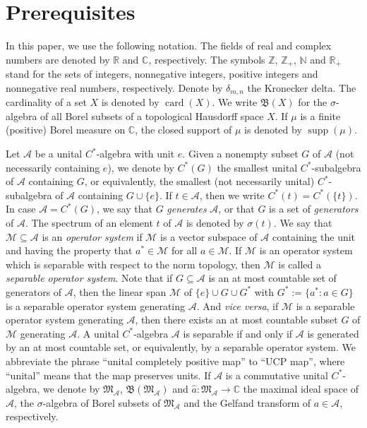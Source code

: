 \documentclass[reqno]{amsproc}
\DeclareMathOperator*{\card}{card}
\DeclareMathOperator{\supp}{supp}
\numberwithin{equation}{section}
\theoremstyle{remark}
\newcommand*{\ascr}{\mathscr{A}}
\newcommand*{\natu}{\mathbb{N}}
\newcommand*{\mcal}{\mathcal{M}}
\newcommand*{\comp}{\mathbb{C}}
\newcommand*{\borel}{\mathfrak{B}}
\newcommand*{\cbb}{\comp}
\theoremstyle{definition}
\newcommand*{\rbb}{\mathbb{R}}
\newcommand*{\zbb}{\mathbb{Z}}
\begin{document}
   \section{\label{Sec.2}Prerequisites}
In this paper, we use the following notation. The
fields of real and complex numbers are denoted by
$\rbb$ and $\mathbb{C}$, respectively. The symbols
$\zbb$, $\zbb_{+}$, $\natu$ and $\rbb_+$ stand for the
sets of integers, nonnegative integers, positive
integers and nonnegative real numbers, respectively.
Denote by $\delta_{m,n}$ the Kronecker delta. The
cardinality of a set $X$ is denoted by $\card(X)$. We
write $\borel(X)$ for the $\sigma$-algebra of all
Borel subsets of a topological Hausdorff space $X$. If
$\mu$ is a finite (positive) Borel measure on $\cbb$,
the closed support of $\mu$ is denoted by
$\supp(\mu)$.

Let $\ascr$ be a unital $C^*$-algebra with unit $e$.
Given a nonempty subset $G$ of $\ascr$ (not
necessarily containing $e$), we denote by $C^*(G)$ the
smallest unital $C^*$-subalgebra of $\ascr$ containing
$G$, or equivalently, the smallest (not necessarily
unital) $C^*$-subalgebra of $\ascr$ containing $G\cup
\{e\}$. If $t\in \ascr$, then we write
$C^*(t)=C^*(\{t\})$. In case $\ascr=C^*(G)$, we say
that $G$ {\em generates} $\ascr$, or that $G$ is a set
of {\em generators} of $\ascr$. The spectrum of an
element $t$ of $\ascr$ is denoted by $\sigma(t)$. We
say that $\mcal \subseteq \ascr$ is an {\em operator
system} if $\mcal$ is a vector subspace of $\ascr$
containing the unit and having the property that
$a^*\in \mcal$ for all $a\in \mcal$. If $\mcal$ is an
operator system which is separable with respect to the
norm topology, then $\mcal$ is called a {\em separable
operator system}. Note that if $ G\subseteq \ascr$ is
an at most countable set of generators of $\ascr$,
then the linear span $\mcal$ of $\{e\} \cup G \cup
G^*$ with $G^*:=\{a^*\colon a \in G\}$ is a separable
operator system generating $\ascr$. And {\em vice
versa}, if $\mcal$ is a separable operator system
generating $\ascr$, then there exists an at most
countable subset $G$ of $\mcal$ generating $\ascr$. A
unital $C^*$-algebra $\ascr$ is separable if and only
if $\ascr$ is generated by an at most countable set,
or equivalently, by a separable operator system. We
abbreviate the phrase ``unital completely positive
map'' to ``UCP map'', where ``unital'' means that the
map preserves units. If $\ascr$ is a commutative
unital $C^*$-algebra, we denote by
$\mathfrak{M}_{\ascr}$, $\borel(\mathfrak{M}_{\ascr})$
and $\widehat{a}\colon \mathfrak{M}_{\ascr} \to \cbb$
the maximal ideal space of $\ascr$, the
$\sigma$-algebra of Borel subsets of
$\mathfrak{M}_{\ascr}$ and the Gelfand transform of
$a\in \ascr$, respectively.
\end{document}
